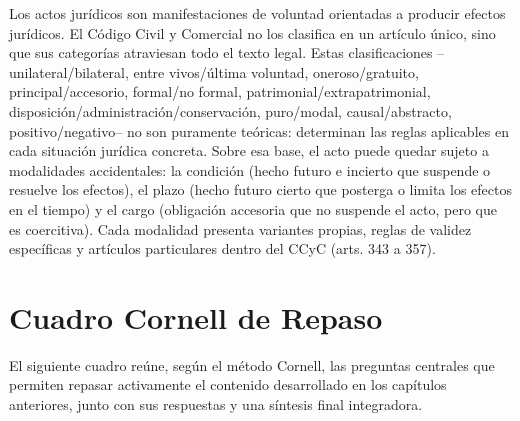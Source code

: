 \documentclass[12pt,oneside]{book}
\begin{document}
Los actos jurídicos son manifestaciones de voluntad orientadas a producir efectos jurídicos. El Código Civil y Comercial no los clasifica en un artículo único, sino que sus categorías atraviesan todo el texto legal. Estas clasificaciones --unilateral/bilateral, entre vivos/última voluntad, oneroso/gratuito, principal/accesorio, formal/no formal, patrimonial/extrapatrimonial, disposición/administración/conservación, puro/modal, causal/abstracto, positivo/negativo-- no son puramente teóricas: determinan las reglas aplicables en cada situación jurídica concreta. Sobre esa base, el acto puede quedar sujeto a modalidades accidentales: la condición (hecho futuro e incierto que suspende o resuelve los efectos), el plazo (hecho futuro cierto que posterga o limita los efectos en el tiempo) y el cargo (obligación accesoria que no suspende el acto, pero que es coercitiva). Cada modalidad presenta variantes propias, reglas de validez específicas y artículos particulares dentro del CCyC (arts. 343 a 357).

\chapter{Cuadro Cornell de Repaso}

El siguiente cuadro reúne, según el método Cornell, las preguntas centrales que permiten repasar activamente el contenido desarrollado en los capítulos anteriores, junto con sus respuestas y una síntesis final integradora.
\end{document}
